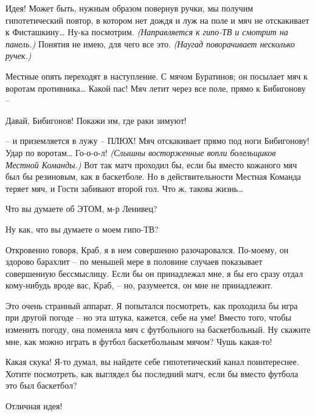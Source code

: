 \documentclass[../main.tex]{subfiles}
\begin{document}
\begin{dialogue}
 Идея! Может быть, нужным образом повернув ручки, мы получим гипотетический повтор, в котором нет дождя и луж на поле и мяч не отскакивает к Фисташкину\ldots{} Ну-ка посмотрим. \emph{(Направляется к гипо-ТВ и смотрит на панель.)} Понятия не имею, для чего все это. \emph{(Наугад поворачивает несколько ручек.)}

 Местные опять переходят в наступление. С мячом Буратинов; он посылает мяч к воротам противника\ldots{} Какой пас! Мяч летит через все поле, прямо к Бибигонову \---

 Давай, Бибигонов! Покажи им, где раки зимуют!

 \--- и приземляется в лужу \--- ПЛЮХ! Мяч отскакивает прямо под ноги Бибигонову! Удар по воротам\ldots{} Го-о-о-л! \emph{(Слышны восторженные вопли болельщиков Местной Команды.)} Вот так матч проходил бы, если бы вместо кожаного мяч был бы резиновым, как в баскетболе. Но в действительности Местная Команда теряет мяч, и Гости забивают второй гол. Что ж, такова жизнь\ldots{}

 Что вы думаете об ЭТОМ, м-р Ленивец?


 Ну как, что вы думаете о моем гипо-ТВ?

 Откровенно говоря, Краб, я в нем совершенно разочаровался. По-моему, он здорово барахлит \--- по меньшей мере в половине случаев показывает совершенную бессмыслицу. Если бы он принадлежал мне, я бы его сразу отдал кому-нибудь вроде вас, Краб, \--- но, разумеется, он мне не принадлежит.

 Это очень странный аппарат. Я попытался посмотреть, как проходила бы игра при другой погоде \--- но эта штука, кажется, себе на уме! Вместо того, чтобы изменить погоду, она поменяла мяч с футбольного на баскетбольный. Ну скажите мне, как можно играть в футбол баскетбольным мячом? Чушь какая-то!

 Какая скука! Я-то думал, вы найдете себе гипотетический канал поинтереснее. Хотите посмотреть, как выглядел бы последний матч, если бы вместо футбола это был баскетбол?

 Отличная идея!


\end{dialogue}
\end{document}
